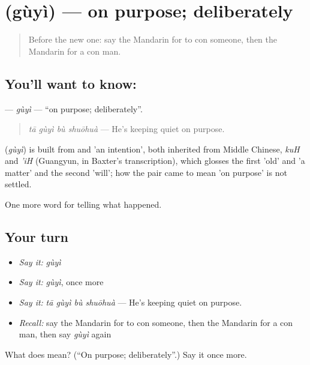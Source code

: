 \section[\texorpdfstring{\zh{故意} (gùyì)}{故意 (gùyì)}]{ (gùyì) — on purpose; deliberately}

\label{lesson:ZH-C309-guyi}



\begin{quote}
Before the new one: say the Mandarin for to con someone, then the Mandarin for a con man.
\end{quote}

\subsection*{You'll want to know: }
\textbf{} — \emph{gùyì} — \textquotedblleft{}on purpose; deliberately\textquotedblright{}.

\begin{quote}
\textbf{} \emph{tā gùyì bù shuōhuà} — He's keeping quiet on purpose.
\end{quote}

\begin{cousinweb}
\textbf{} (\emph{gùyì}) is built from  and  'an intention', both inherited from Middle Chinese, \emph{kuH} and \emph{'iH} (Guangyun, in Baxter's transcription), which glosses the first 'old' and 'a matter' and the second 'will'; how the pair came to mean 'on purpose' is not settled.
\end{cousinweb}

\begin{grammarlens}[title={What you've built}]
One more word for telling what happened.
\end{grammarlens}

\subsection*{Your turn}
\begin{itemize}
\raggedright
  \item \emph{Say it:} \emph{gùyì}
  \item \emph{Say it:} \emph{gùyì}, once more
  \item \emph{Say it:} \emph{tā gùyì bù shuōhuà} — He's keeping quiet on purpose.
  \item \emph{Recall:} say the Mandarin for to con someone, then the Mandarin for a con man, then say \emph{gùyì} again
\end{itemize}

\begin{tcolorbox}[breakable,colback=teal!4,colframe=teal!35!black,title={Before you move on}]
What does  mean? (\textquotedblleft{}On purpose; deliberately\textquotedblright{}.) Say it once more.
\end{tcolorbox}
